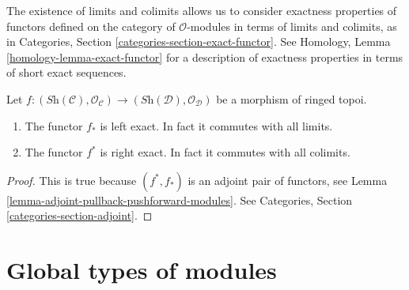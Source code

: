 \noindent
The existence of limits and colimits allows us to consider exactness
properties of functors defined on the category of $\mathcal{O}$-modules
in terms of limits and colimits, as in
Categories, Section \ref{categories-section-exact-functor}.
See Homology, Lemma \ref{homology-lemma-exact-functor} for a description of
exactness properties in terms of short exact sequences.

\begin{lemma}
\label{lemma-exactness-pushforward-pullback}
Let $f : (\textit{Sh}(\mathcal{C}), \mathcal{O}_{\mathcal{C}})
\to (\textit{Sh}(\mathcal{D}), \mathcal{O}_{\mathcal{D}})$
be a morphism of ringed topoi.
\begin{enumerate}
\item The functor $f_*$ is left exact. In fact it commutes with
all limits.
\item The functor $f^*$ is right exact. In fact it commutes
with all colimits.
\end{enumerate}
\end{lemma}

\begin{proof}
This is true because $(f^*, f_*)$ is an adjoint pair
of functors, see
Lemma \ref{lemma-adjoint-pullback-pushforward-modules}.
See Categories, Section \ref{categories-section-adjoint}.
\end{proof}








\section{Global types of modules}
\label{section-global}

